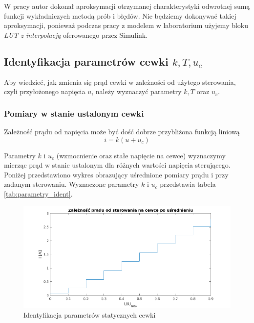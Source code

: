 W pracy \cite{Bania1999} autor dokonał aproksymacji otrzymanej charakterystyki odwrotnej sumą funkcji wykładniczych metodą prób i błędów. Nie będziemy dokonywać takiej aproksymacji, ponieważ podczas pracy z modelem w laboratorium użyjemy bloku \textit{LUT z interpolacją} oferowanego przez Simulink.



\subsection{Identyfikacja parametrów cewki $k, T, u_c$ }

Aby wiedzieć, jak zmienia się prąd cewki w zależności od użytego sterowania, czyli przyłożonego napięcia $u$, należy wyznaczyć parametry $k, T$ oraz $u_c$.

\subsubsection{Pomiary w stanie ustalonym cewki}

Zależność prądu od napięcia może być dość dobrze przybliżona funkcją liniową 
\cite{Bania1999}
\begin{equation}
i = k(u + u_c)
\end{equation}

Parametry $k$ i $u_c$ (wzmocnienie oraz stałe napięcie na cewce) wyznaczymy mierząc prąd w stanie ustalonym dla różnych wartości napięcia sterującego. Poniżej przedstawiono wykres obrazujący uśrednione pomiary prądu i przy zadanym sterowaniu. Wyznaczone parametry $k$ i $u_c$ przedstawia tabela \ref{tab:parametry_ident}.


\begin{figure}[!htb]
\centering
\includegraphics[scale=0.85]{img/prad_cewki_od_sterowania.png}
\caption{Identyfikacja parametrów statycznych cewki}
\label{rys:cewka_k_uc}
\end{figure}

